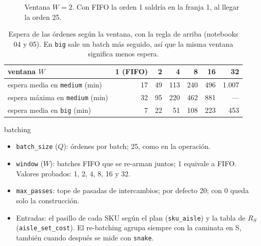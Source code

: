\documentclass[11pt,a4paper,oneside]{report}
\newcommand{\code}[1]{\texttt{\small #1}}
\newcommand{\RS}{R_S}
\begin{document}
\begin{figure}[ht]
\centering
{}
\caption{Ventana $W = 2$. Con FIFO la orden 1 saldría en la franja 1, al llegar la orden 25.}
\label{fig:espera}
\end{figure}

\begin{table}[ht]
\centering\small
\begin{tabular}{@{}lrrrrrr@{}}
\toprule
ventana $W$ & 1 (FIFO) & 2 & 4 & 8 & 16 & 32 \\
\midrule
espera media en \code{medium} (min) & 17 & 49 & 113 & 240 & 496 & 1.007 \\
espera máxima en \code{medium} (min) & 32 & 95 & 220 & 462 & 881 & --- \\
espera media en \code{big} (min) & 7 & 22 & 51 & 108 & 223 & 453 \\
\bottomrule
\end{tabular}
\caption{Espera de las órdenes según la ventana, con la regla de arriba (notebooks 04 y 05).
En \code{big} sale un batch más seguido, así que la misma ventana significa menos espera.}
\label{tab:espera}
\end{table}

\begin{hiper}{batching}
\begin{itemize}
  \item \code{batch\_size} ($Q$): órdenes por batch; 25, como en la operación.
  \item \code{window} ($W$): batches FIFO que se re-arman juntos; 1 equivale a FIFO. Valores
        probados: 1, 2, 4, 8, 16 y 32.
  \item \code{max\_passes}: tope de pasadas de intercambios; por defecto 20; con 0 queda solo
        la construcción.
  \item Entradas: el pasillo de cada SKU según el plan (\code{sku\_aisle}) y la tabla de $\RS$
        (\code{aisle\_set\_cost}). El re-batching agrupa siempre con la caminata en S, también
        cuando después se mide con \code{snake}.
\end{itemize}
\end{hiper}
\end{document}
